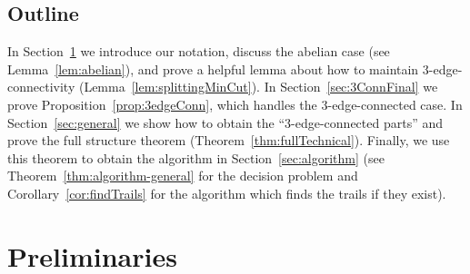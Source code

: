 \documentclass[a4paper, 12pt]{article}
\begin{document}




\subsection*{Outline}
In Section~\ref{sec:prelim} we introduce our notation, discuss the abelian case (see Lemma~\ref{lem:abelian}), and prove a helpful lemma about how to maintain $3$-edge-connectivity (Lemma~\ref{lem:splittingMinCut}). In Section~\ref{sec:3ConnFinal} we prove Proposition~\ref{prop:3edgeConn}, which handles the $3$-edge-connected case. In Section~\ref{sec:general} we show how to obtain the ``$3$-edge-connected parts'' and prove the full structure theorem (Theorem~\ref{thm:fullTechnical}). Finally, we use this theorem to obtain the algorithm in Section~\ref{sec:algorithm} (see Theorem~\ref{thm:algorithm-general} for the decision problem and Corollary~\ref{cor:findTrails} for the algorithm which finds the trails if they exist).






\section{Preliminaries}
\label{sec:prelim}
\end{document}
